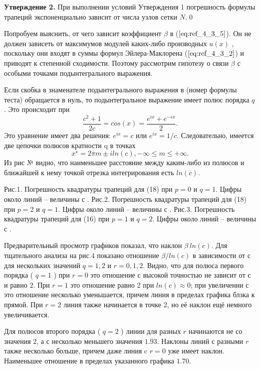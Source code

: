\textbf{Утверждение 2.} При выполнении условий Утверждения 1 погрешность
формулы трапеций экспоненциально зависит от числа узлов сетки $N$.\qed

Попробуем выяснить, от чего зависит коэффициент $\beta$ в ($\ref{eq:ref_4_3_5}$). Он не
должен зависеть от максимумов модулей каких-либо производных $u(x)$ ,
поскольку они входят в суммы формул Эйлера-Маклорена ($\ref{eq:ref_4_3_2}$) и приводят к
степенной сходимости. Поэтому рассмотрим гипотезу о связи $\beta$ с особыми точками
подынтегрального выражения.

Если скобка в знаменателе подынтегрального выражения в (номер формулы теста) обращается в нуль, то подынтегральное выражение имеет полюс порядка $q$. Это происходит при
\begin{equation}
\frac{c^{2} + 1}{2c}=cos(x)=\frac{e^{ix}+e^{-ix}}{2}.
\end{equation}
Это уравнение имеет два решения: $e^{ix}=c$ или $e^{ix}=1/c$. Следовательно, имеется две цепочки полюсов кратности q в точках
\begin{equation}
x^{\star} = 2\pi m \pm iln(c),-\infty \leqslant m \leqslant +\infty.
\end{equation}
Из рис № видно, что наименьшее расстояние между каким-либо из полюсов и ближайшей к нему
точкой отрезка интегрирования есть $ln(c)$.

Рис.1. Погрешность квадратуры трапеций для (18) при $p = 0$ и $q =1$.
Цифры около линий – величины с .
Рис.2. Погрешность квадратуры трапеций для (18) при $p = 2$ и $q =1$.
Цифры около линий – величины с .
Рис.3. Погрешность квадратуры трапеций для (16) при $p =1$ и $q = 2$.
Цифры около линий – величины с .

Предварительный просмотр графиков показал, что наклон $\beta ~ ln(c)$. Для
тщательного анализа на рис.4 показано отношение $\beta / ln(c)$ в зависимости от $с$
для нескольких значений $q =1,2$ и $r = 0,1,2$. Видно, что для полюса первого
порядка ( $q =1$ ) при $r=0$ это отношение с высокой точностью не зависит от
$с$ и равно $2$. При $r=1$ это отношение равно 2 при $ln(c) \approx 0$; при увеличении с это отношение несколько уменьшается, причем линия в пределах графика блзка к прямой. При $r=2$ линия также начинается в точке 2, но её наклон ещё немного увеличивается.

Для полюсов второго порядка ( $q = 2$ ) линии для разных $r$ начинаются не со значения $2$, а с несколько меньшего значения $1.93$. Наклоны линий с разными $r$ также несколько больше, причем даже линия c $r=0$ уже имеет наклон. Наименьшее отношение в пределах указанного графика $1.70$.

